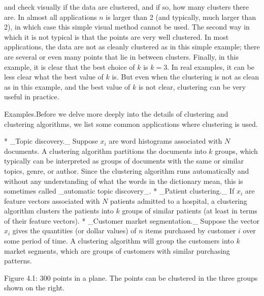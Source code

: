 and check visually if the data are clustered, and if so, how many clusters there are. In almost all applications \(n\) is larger than 2 (and typically, much larger than 2), in which case this simple visual method cannot be used. The second way in which it is not typical is that the points are very well clustered. In most applications, the data are not as cleanly clustered as in this simple example; there are several or even many points that lie in between clusters. Finally, in this example, it is clear that the best choice of \(k\) is \(k=3\). In real examples, it can be less clear what the best value of \(k\) is. But even when the clustering is not as clean as in this example, and the best value of \(k\) is not clear, clustering can be very useful in practice.

Examples.Before we delve more deeply into the details of clustering and clustering algorithms, we list some common applications where clustering is used.

* _Topic discovery._ Suppose \(x_{i}\) are word histograms associated with \(N\) documents. A clustering algorithm partitions the documents into \(k\) groups, which typically can be interpreted as groups of documents with the same or similar topics, genre, or author. Since the clustering algorithm runs automatically and without any understanding of what the words in the dictionary mean, this is sometimes called _automatic topic discovery_.
* _Patient clustering._ If \(x_{i}\) are feature vectors associated with \(N\) patients admitted to a hospital, a clustering algorithm clusters the patients into \(k\) groups of similar patients (at least in terms of their feature vectors).
* _Customer market segmentation._ Suppose the vector \(x_{i}\) gives the quantities (or dollar values) of \(n\) items purchased by customer \(i\) over some period of time. A clustering algorithm will group the customers into \(k\) market segments, which are groups of customers with similar purchasing patterns.

Figure 4.1: 300 points in a plane. The points can be clustered in the three groups shown on the right.

 